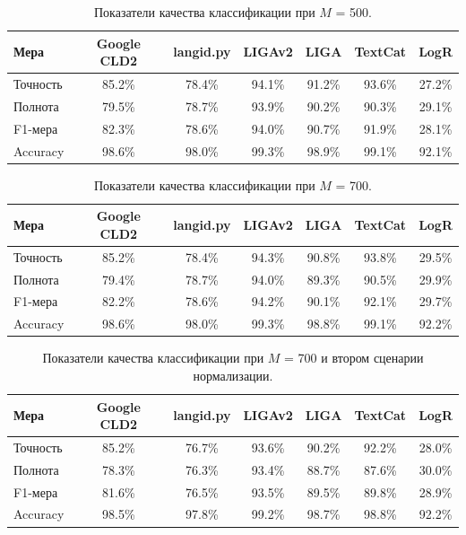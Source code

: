 \documentclass[a4paper, 14pt]{article}
\begin{document}
\begin{center}
\begin{table}[h]
\begin{tabular*}{0.954\textwidth}{| l| *{6}{|c} |}
\hline 
Мера & Google CLD2 & langid.py & LIGAv2 & LIGA & TextCat  & LogR\\
\hline
Точность & 85.2\% & 78.4\% & 94.1\% & 91.2\% & 93.6\% & 27.2\%\\
Полнота & 79.5\% & 78.7\% & 93.9\% & 90.2\% & 90.3\% & 29.1\%\\
F1-мера & 82.3\% & 78.6\% & 94.0\% & 90.7\% & 91.9\% & 28.1\%\\
Accuracy & 98.6\% & 98.0\% & 99.3\% & 98.9\% & 99.1\% & 92.1\%\\
\hline
\end{tabular*}
\caption{Показатели качества классификации при $M$ = 500.}
\label{table:500}
\end{table}
\end{center}

\begin{center}
\begin{table}[h]
\begin{tabular*}{0.954\textwidth}{| l| *{6}{|c} |}
\hline 
Мера & Google CLD2 & langid.py & LIGAv2 & LIGA & TextCat  & LogR\\
\hline
Точность & 85.2\% & 78.4\% & 94.3\% & 90.8\% & 93.8\% & 29.5\%\\
Полнота & 79.4\% & 78.7\% & 94.0\% & 89.3\% & 90.5\% & 29.9\%\\
F1-мера & 82.2\% & 78.6\% & 94.2\% & 90.1\% & 92.1\% & 29.7\%\\
Accuracy & 98.6\% & 98.0\% & 99.3\% & 98.8\% & 99.1\% & 92.2\%\\
\hline
\end{tabular*}
\caption{Показатели качества классификации при $M$ = 700.}
\label{table:700}
\end{table}
\end{center}


\begin{center}
\begin{table}[h]
\begin{tabular*}{0.954\textwidth}{| l| *{6}{|c} |}
\hline 
Мера & Google CLD2 & langid.py & LIGAv2 & LIGA & TextCat  & LogR\\
\hline
Точность & 85.2\% & 76.7\% & 93.6\% & 90.2\% & 92.2\% & 28.0\%\\
Полнота & 78.3\% & 76.3\% & 93.4\% & 88.7\% & 87.6\% & 30.0\%\\
F1-мера & 81.6\% & 76.5\% & 93.5\% & 89.5\% & 89.8\% & 28.9\%\\
Accuracy & 98.5\% & 97.8\% & 99.2\% & 98.7\% & 98.8\% & 92.2\%\\
\hline
\end{tabular*}
\caption{Показатели качества классификации при $M$ = 700 и втором сценарии нормализации.}
\label{table:700_2}
\end{table}
\end{center}
\end{document}
